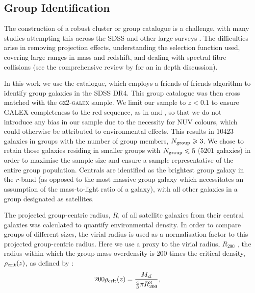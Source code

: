 \documentclass[useAMS,usenatbib]{mn2e}
\def\minor		{\color{minorcol}}
\begin{document}
\subsection{Group Identification}\label{sec:groups}


The construction of a robust cluster or group catalogue is a challenge, with many studies attempting this across the SDSS \citep[e.g. ][]{merchan05, miller05, berlind06, yang07, tago08, tago10, tinker11, munoz12, tempel14} and other large surveys \citep{tucker00, merchan02, eke04, cucciati10, robotham11, knobel12}. The difficulties arise in removing projection effects, understanding the selection function used, covering large ranges in mass and redshift, and dealing with spectral fibre collisions (see the comprehensive review by \citealt{postman02} for an in depth discussion). 


In this work we use the \citet{berlind06} catalogue, which employs a friends-of-friends algorithm to identify group galaxies in the SDSS DR4. This group catalogue was then cross matched with the \textsc{gz2-galex} sample. We limit our sample to $z < 0.1$ to ensure GALEX completeness to the red sequence, as in \citealt{wyder07} and \citealt{yesuf14}, so that we do not introduce any bias in our sample due to the necessity for NUV colours, which could otherwise be attributed to environmental effects. This results in $10423$ galaxies in groups with the number of group members, $N_{\rm{group}} \geq 3$. {\minor We chose to retain those galaxies residing in smaller groups with $N_{\rm{group}} \leq 5$ ($5201$ galaxies) in order to maximise the sample size and ensure a sample representative of the entire group population.} Centrals are identified as the brightest group galaxy in the $r$-band (as opposed to the most massive group galaxy which necessitates an assumption of the mass-to-light ratio of a galaxy), with all other galaxies in a group designated as satellites.

The projected group-centric radius, $R$, of all satellite galaxies from their central galaxies was calculated to quantify environmental density. In order to compare groups of different sizes, the virial radius is used as a normalisation factor to this projected group-centric radius. Here we use a proxy to the virial radius, $R_{200}$ \citep[see][]{navarro95}, the radius within which the group mass overdensity is 200 times the critical density, $\rho_{\rm{crit}}(z)$, as defined by \citealt{finn05}:
\begin{equation}\label{eq:overdense}
200\rho_{\rm{crit}}(z) = \frac{M_{cl}}{\frac{4}{3}\pi R_{200}^3},
\end{equation}
\end{document}

